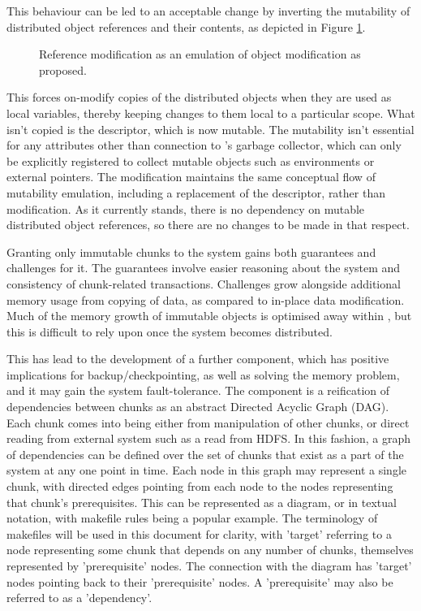 This behaviour can be led to an acceptable change by inverting the mutability of distributed object references and their contents, as depicted in Figure \cref{fig:modifyrefprop}.

\begin{figure}

\caption{Reference modification as an emulation of object modification as proposed.}
\label{fig:modifyrefprop}
\end{figure}

This forces on-modify copies of the distributed objects when they are used as local variables, thereby keeping changes to them local to a particular scope.
What isn't copied is the descriptor, which is now mutable.
The mutability isn't essential for any attributes other than connection to \R{}'s garbage collector, which can only be explicitly registered to collect mutable objects such as environments or external pointers.
The modification maintains the same conceptual flow of mutability emulation, including a replacement of the descriptor, rather than modification.
As it currently stands, there is no \lsr{} dependency on mutable distributed object references, so there are no changes to be made in that respect.

Granting only immutable chunks to the \lsr{} system gains both guarantees and challenges for it.
The guarantees involve easier reasoning about the system and consistency of chunk-related transactions\cite{goetz2006java}.
Challenges grow alongside additional memory usage from copying of data, as compared to in-place data modification.
Much of the memory growth of immutable objects is optimised away within \R{}, but this is difficult to rely upon once the system becomes distributed\cite{rcore2020lang}.

This has lead to the development of a further component, which has positive implications for backup/checkpointing, as well as solving the memory problem, and it may gain the system fault-tolerance.
The component is a reification of dependencies between chunks as an abstract Directed Acyclic Graph (DAG).
Each chunk comes into being either from manipulation of other chunks, or direct reading from external system such as a read from HDFS.
In this fashion, a graph of dependencies can be defined over the set of chunks that exist as a part of the system at any one point in time.
Each node in this graph may represent a single chunk, with directed edges pointing from each node to the nodes representing that chunk's prerequisites.
This can be represented as a diagram, or in textual notation, with makefile rules being a popular example\cite{shal2009build}.
The terminology of makefiles will be used in this document for clarity, with 'target' referring to a node representing some chunk that depends on any number of chunks, themselves represented by 'prerequisite' nodes. 
The connection with the diagram has 'target' nodes pointing back to their 'prerequisite' nodes.
A 'prerequisite' may also be referred to as a 'dependency'.

